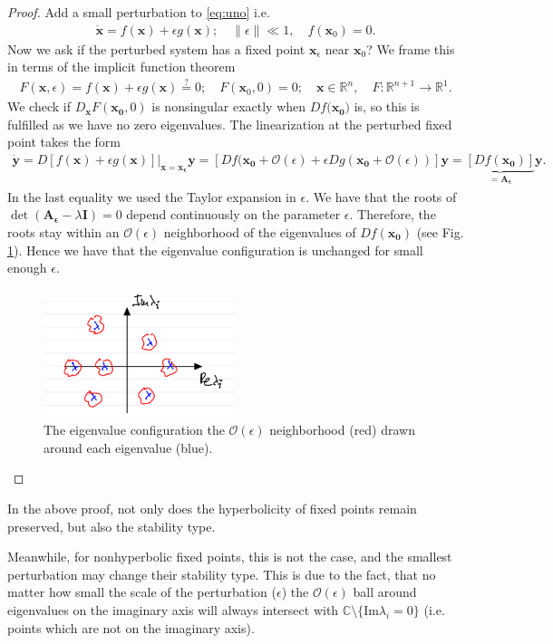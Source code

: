 \begin{proof}
	Add a small perturbation to \eqref{eq:uno} i.e.
\begin{align}
	\dot{\bm{x} } = f(\bm{x}) + \epsilon g(\bm{x} );\quad \|\epsilon \| \ll 1,\quad f(\bm{x} _0) =0.
\end{align}
Now we ask if the perturbed system has a fixed point $\bm{x} _{\epsilon}$ near $\bm{x} _0$? We frame this in terms of the implicit function theorem
\begin{align}
	F(\bm{x} ,\epsilon) = f(\bm{x} ) + \epsilon g(\bm{x} ) \stackrel{?}{=} 0;\quad F(\bm{x}_0, 0) = 0;\quad \bm{x} \in \mathbb{R}^{n}, \quad F:\mathbb{R}^{n+1} \to \mathbb{R}^{1}.
\end{align}
We check if $D_{\bm{x} }F(\bm{x_0} ,0) $ is nonsingular exactly when $Df(\bm{x_0)} $ is, so this is fulfilled as we have no zero eigenvalues. The linearization at the perturbed fixed point takes the form
\begin{align}
	\dot{\bm{y} } = D \left. \left[ f(\bm{x} ) + \epsilon g(\bm{x} ) \right]\right|_{\bm{x} = \bm{x_\epsilon} }\bm{y} = \left[ Df(\bm{x_0}  + \mathcal{O}(\epsilon) + \epsilon Dg(\bm{x_0} + \mathcal{O}(\epsilon)) \right] \bm{y} 
		= \underbrace{\left[ Df(\bm{x_0})\right]}_{=\bm{A_{\epsilon}} } \bm{y}.
\end{align}
In the last equality we used the Taylor expansion in $\epsilon$. We have that the roots of $\det(\bm{A_{\epsilon}}-\lambda \bm{I} ) = 0 $ depend continuously on the parameter $\epsilon$. Therefore, the roots stay within an $\mathcal{O}(\epsilon)$ neighborhood of the eigenvalues of $Df(\bm{x_0} )$ (see Fig. \ref{fig:eps_ball_eigv}). Hence we have that the eigenvalue configuration is unchanged for small enough $\epsilon$.
\begin{figure}[h!]
	\centering
	\includegraphics[width=0.5\textwidth]{figures/ch2/16eps_ball_eigv.png}
	\caption{The eigenvalue configuration the $\mathcal{O}(\epsilon)$ neighborhood (red) drawn around each eigenvalue (blue).}
	\label{fig:eps_ball_eigv}
\end{figure}
\end{proof}
\begin{remark}[]
	In the above proof, not only does the hyperbolicity of fixed points remain preserved, but also the stability type.
\end{remark}
Meanwhile, for nonhyperbolic fixed points, this is not the case, and the smallest perturbation may change their stability type. This is due to the fact, that no matter how small the scale of the perturbation ($\epsilon$) the $\mathcal{O}(\epsilon)$ ball around eigenvalues on the imaginary axis will always intersect with $\mathbb{C}\setminus \{  \textrm{Im}\lambda_i =0 \}$ (i.e. points which are not on the imaginary axis).

